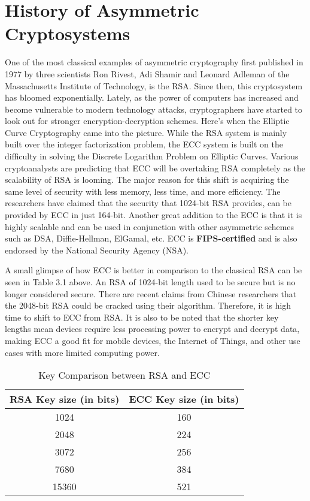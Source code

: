 \section{History of Asymmetric Cryptosystems}
One of the most classical examples of asymmetric cryptography first published in 1977 by three scientists Ron Rivest, Adi Shamir and Leonard Adleman of the Massachusetts Institute of Technology, is the RSA.
Since then, this cryptosystem has bloomed exponentially. Lately, as the power of computers has increased and become vulnerable to modern technology attacks, cryptographers have started to look out for stronger encryption-decryption schemes.
Here's when the Elliptic Curve Cryptography came into the picture. While the RSA system is mainly built over the integer factorization problem, the ECC system is built on the difficulty in solving the Discrete Logarithm Problem on Elliptic Curves.
Various cryptoanalysts are predicting that ECC will be overtaking RSA completely as the scalability of RSA is looming. 
The major reason for this shift is acquiring the same level of security with less memory, less time, and more efficiency.
The researchers have claimed that the security that 1024-bit RSA provides, can be provided by ECC in just 164-bit.
Another great addition to the ECC is that it is highly scalable and can be used in conjunction with other asymmetric schemes such as DSA, Diffie-Hellman, ElGamal, etc. 
ECC is \textbf{FIPS-certified} and is also endorsed by the National Security Agency (NSA). \newline

\par
\noindent A small glimpse of how ECC is better in comparison to the classical RSA can be seen in Table 3.1 above. An RSA of 1024-bit length used to be secure but is no longer considered secure. There are recent claims from Chinese researchers that the 2048-bit RSA could be cracked using their algorithm. Therefore, it is high time to shift to ECC from RSA. It is also to be noted that the shorter key lengths mean devices require less processing power to encrypt and decrypt data, making ECC a good fit for mobile devices, the Internet of Things, and other use cases with more limited computing power.

\begin{table}[]
\centering
\begin{tabular}{|c|c|}
\hline
RSA Key size (in bits) & ECC Key size (in bits) \\ \hline
1024 & 160 \\ \hline
2048 & 224 \\ \hline
3072 & 256 \\ \hline
7680 & 384 \\ \hline
15360 & 521 \\ \hline
\end{tabular}
\label{table:1}
\caption{Key Comparison between RSA and ECC}
\end{table}

